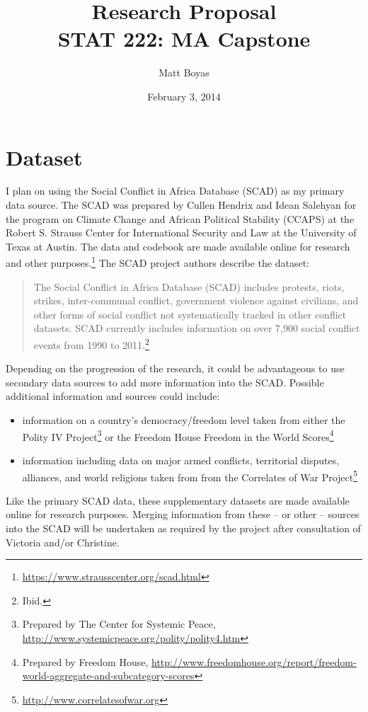 \documentclass{article}
\begin{document}
\title{Research Proposal\\STAT 222: MA Capstone}
\author{Matt Boyas}

\date{February 3, 2014}
\maketitle
\section{Dataset}
I plan on using the Social Conflict in Africa Database (SCAD) as my primary data source.  The SCAD was prepared by Cullen Hendrix and Idean Salehyan for the program on Climate Change and African Political Stability (CCAPS) at the Robert S. Strauss Center for International Security and Law at the University of Texas at Austin.  The data and codebook are made available online for research and other purposes.\footnote{\url{https://www.strausscenter.org/scad.html}}  The SCAD project authors describe the dataset:

\blockquote{The Social Conflict in Africa Database (SCAD) includes protests, riots, strikes, inter-communal conflict, government violence against civilians, and other forms of social conflict not systematically tracked in other conflict datasets. SCAD currently includes information on over 7,900 social conflict events from 1990 to 2011.\footnote{Ibid.}}
Depending on the progression of the research, it could be advantageous to use secondary data sources to add more information into the SCAD.  Possible additional information and sources could include:
\begin{itemize}
\item information on a country's democracy/freedom level taken from either the Polity IV Project\footnote{Prepared by The Center for Systemic Peace, \url{http://www.systemicpeace.org/polity/polity4.htm}} or the Freedom House Freedom in the World Scores\footnote{Prepared by Freedom House, \url{http://www.freedomhouse.org/report/freedom-world-aggregate-and-subcategory-scores}}
\item information including data on major armed conflicts, territorial disputes, alliances, and world religions taken from from the Correlates of War Project\footnote{\url{http://www.correlatesofwar.org}}
\end{itemize}
Like the primary SCAD data, these supplementary datasets are made available online for research purposes.  Merging information from these -- or other -- sources into the SCAD will be undertaken as required by the project after consultation of Victoria and/or Christine.
\end{document}
